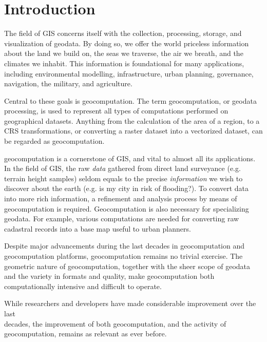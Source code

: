 \chapter{Introduction}


The field of \ac{GIS} concerns itself with the collection, processing, storage, and visualization of geodata. 
By doing so, we offer the world priceless information about the land we build on, the seas we traverse, the air we breath, and the climates we inhabit. 
This information is foundational for many applications, including environmental modelling, infrastructure, urban planning, governance, navigation, the military, and agriculture.   

Central to these goals is \ac{geocomputation}. 
The term geocomputation, or geodata processing, is used to represent all types of computations performed on geographical datasets. Anything from the calculation of the area of a region, to a \ac{CRS} transformations, or converting a raster dataset into a vectorized dataset, can be regarded as geocomputation.

geocomputation is a cornerstone of \ac{GIS}, and vital to almost all its applications.
In the field of GIS, the raw \emph{data} gathered from direct land surveyance (e.g. terrain height samples) seldom equals to the precise \emph{information} we wish to discover about the earth (e.g. is my city in risk of flooding?).
To convert data into more rich information, a refinement and analysis process by means of geocomputation is required. 
Geocomputation is also necessary for specializing geodata. 
For example, various computations are needed for converting raw cadastral records into a base map useful to urban planners.

Despite major advancements during the last decades in geocomputation and geocomputation platforms, geocomputation remains no trivial exercise. 
The geometric nature of geocomputation, together with the sheer scope of geodata and the variety in formats and quality, make geocomputation both computationally intensive and difficult to operate. 

While researchers and developers have made considerable improvement over the last \\ decades, the improvement of both geocomputation, and the activity of geocomputation, remains as relevant as ever before. 

